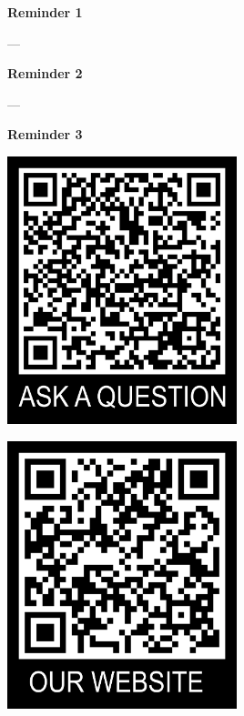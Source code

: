 \documentclass[aspectratio=169,hyperref={unicode}]{beamer}
\begin{document}
\begin{frame}
\begin{center}
\textbf{Reminder 1}

---

\textbf{Reminder 2}

---

\textbf{Reminder 3}

\vspace{1em}

\begin{minipage}{0.4\textwidth}
\centering
    \includegraphics[width=0.5\textwidth]{../QRtemplate_5.png}
  \end{minipage}
  \hfill
  \begin{minipage}{0.4\textwidth}
  \centering
    \includegraphics[width=0.5\textwidth]{../QRtemplate_4.png}
  \end{minipage}
\end{center}
\end{frame}
\end{document}
